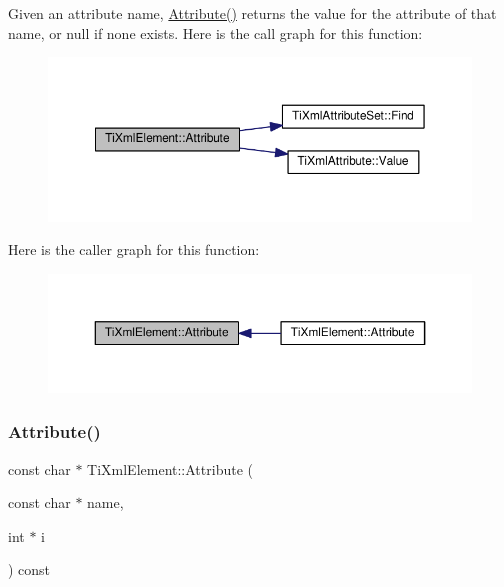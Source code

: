 Given an attribute name, \hyperlink{class_ti_xml_element_a6042f518748f475a7ac4b4e0b509eb05}{Attribute()} returns the value for the attribute of that name, or null if none exists. Here is the call graph for this function\+:
\nopagebreak
\begin{figure}[H]
\begin{center}
\leavevmode
\includegraphics[width=350pt]{class_ti_xml_element_a6042f518748f475a7ac4b4e0b509eb05_cgraph}
\end{center}
\end{figure}
Here is the caller graph for this function\+:
\nopagebreak
\begin{figure}[H]
\begin{center}
\leavevmode
\includegraphics[width=350pt]{class_ti_xml_element_a6042f518748f475a7ac4b4e0b509eb05_icgraph}
\end{center}
\end{figure}
\mbox{\label{class_ti_xml_element_a8005d0b808fd02bd1246710cdf95e5f6}} 
\subsubsection{\texorpdfstring{Attribute()}{Attribute()}\hspace{0.1cm}{\footnotesize\ttfamily [2/3]}}
{\footnotesize\ttfamily const char $\ast$ Ti\+Xml\+Element\+::\+Attribute (\begin{DoxyParamCaption}\item[{const char $\ast$}]{name,  }\item[{int $\ast$}]{i }\end{DoxyParamCaption}) const}

